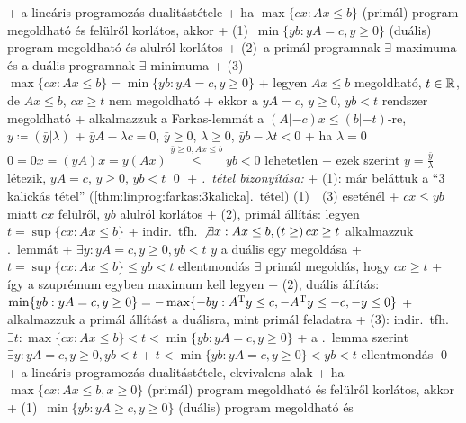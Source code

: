 
+ \thm \label{thm:linprog:dual:dual}a lineáris programozás dualitástétele
  + ha $\max \{ cx : Ax \le b \}$ (primál) program megoldható és
    felülről korlátos, akkor
    + (1)~$\min \{ yb : yA = c, y \ge 0 \}$ (duális) program megoldható és
      alulról korlátos
    + (2)~a primál programnak $\exists$ maximuma és a duális programnak
      $\exists$ minimuma
    + (3)~$\max \{ cx : Ax \le b \} = \min \{ yb : yA = c, y \ge 0 \}$
+ \lemma \label{lem:linprog:dual:t}legyen $A x \le b$ megoldható, $t
  \in \mathbb{R}$, de $A x \le b$, $cx \ge t$ nem megoldható
  + ekkor a $yA = c$, $y \ge 0$, $yb < t$ rendszer megoldható
  + \proof alkalmazzuk a Farkas-lemmát a $(A|-c) x \le (b|-t)$-re, $y
    \coloneqq (\bar{y}|\lambda)$
    + $\bar{y} A - \lambda c = 0$, $\bar{y} \ge 0$, $\lambda \ge 0$,
      $\bar{y} b - \lambda t < 0$
    + ha $\lambda = 0$ \RA $0 = 0 x = (\bar{y} A) x = \bar{y} (Ax)
      \overset{\bar{y} \ge 0, Ax \le b}{\le} \bar{y} b < 0$ \RA%
      lehetetlen
    + ezek szerint $y = \frac{\bar{y}}{\lambda}$ létezik, $y A = c$,
      $y \ge 0$, $yb < t$ \qed
+ \emph{.~tétel bizonyítása:}
  + (1): már beláttuk a ``3 kalickás tétel''
  (\ref{thm:linprog:farkas:3kalicka}.~tétel) (1)~\LRA~(3) eseténél
    + $cx \le yb$ miatt $cx$ felülről, $yb$ alulról korlátos
  + (2), primál állítás: legyen $t = \sup \{ cx : Ax \le b \}$
    + indir.~tfh.~$\not\exists x : Ax \le b, (t \ge )\,cx \ge t$ \RA alkalmazzuk
    .~lemmát
    + $\exists y : yA = c, y \ge 0, yb < t$ \RA $y$ a duális egy
      megoldása
    +  $t = \sup \{ cx : Ax \le b \} \le yb < t$ \RA ellentmondás \RA $\exists$ primál
      megoldás, hogy $cx \ge t$
    + így a szuprémum egyben maximum kell legyen
  + (2), duális állítás: $\min \{ yb : yA = c, y \ge 0 \} = - \max \{
    -by : A^{\mathrm{T}} y \le c, -A^{\mathrm{T}} y \le -c, -y \le 0 \}$
    + alkalmazzuk a primál állítást a duálisra, mint primál feladatra
  + (3): indir.~tfh.~$\exists t : \max \{ cx : Ax \le b \} < t < \min
    \{ yb : yA = c, y \ge 0 \}$
    + a .~lemma szerint $\exists y : yA = c,
      y \ge 0, yb < t$
    + $t < \min \{ yb : yA = c, y \ge 0 \} < yb < t$ \RA ellentmondás
    \qed
+ \thm \label{thm:linprog:dual:dual}a lineáris programozás
  dualitástétele, ekvivalens alak
  + ha $\max \{ cx : Ax \le b, x \ge 0 \}$ (primál) program megoldható és
    felülről korlátos, akkor
    + (1)~$\min \{ yb : yA \ge c, y \ge 0 \}$ (duális) program megoldható és

